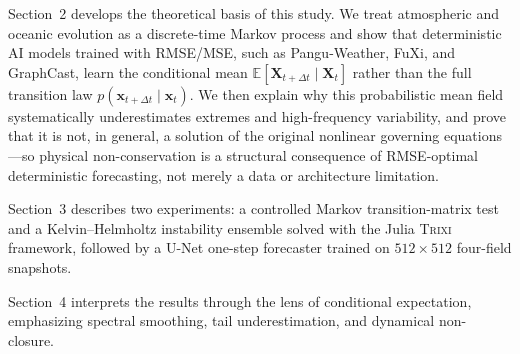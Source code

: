 
Section~2 develops the theoretical basis of this study.
We treat atmospheric and oceanic evolution as a discrete-time Markov process and show that deterministic AI models trained with RMSE/MSE, such as Pangu-Weather, FuXi, and GraphCast, learn the conditional mean
$\mathbb{E}[\mathbf{X}_{t+\Delta t}\mid \mathbf{X}_t]$
rather than the full transition law $p(\mathbf{x}_{t+\Delta t}\mid \mathbf{x}_t)$.
We then explain why this probabilistic mean field systematically underestimates extremes and high-frequency variability, and prove that it is not, in general, a solution of the original nonlinear governing equations---so physical non-conservation is a structural consequence of RMSE-optimal deterministic forecasting, not merely a data or architecture limitation.

Section~3 describes two experiments: a controlled Markov transition-matrix test and a Kelvin--Helmholtz instability ensemble solved with the Julia \textsc{Trixi} framework, followed by a U-Net one-step forecaster trained on $512\times512$ four-field snapshots.

Section~4 interprets the results through the lens of conditional expectation, emphasizing spectral smoothing, tail underestimation, and dynamical non-closure.
